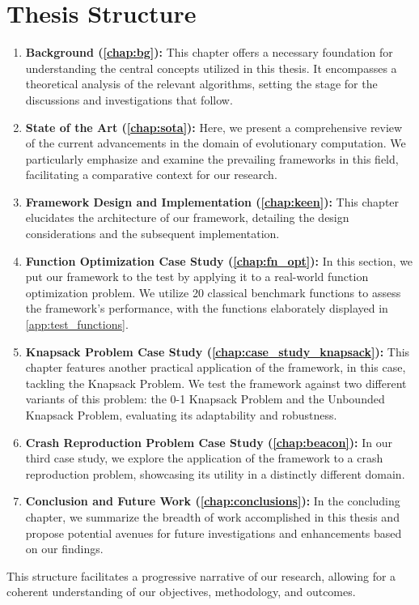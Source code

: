 \section{Thesis Structure}
\label{sec:structure}

  \begin{enumerate}
    \item \textbf{Background (\vref{chap:bg}):} This chapter offers a necessary 
      foundation for understanding the central concepts utilized in this thesis.
      It encompasses a theoretical analysis of the relevant algorithms, setting 
      the stage for the discussions and investigations that follow.
    \item \textbf{State of the Art (\vref{chap:sota}):} Here, we present a 
      comprehensive review of the current advancements in the domain of 
      evolutionary computation.
      We particularly emphasize and examine the prevailing frameworks in this 
      field, facilitating a comparative context for our research.
    \item \textbf{Framework Design and Implementation (\vref{chap:keen}):} This 
      chapter elucidates the architecture of our framework, detailing the
      design considerations and the subsequent implementation.
    \item \textbf{Function Optimization Case Study (\vref{chap:fn_opt}):} In 
      this section, we put our framework to the test by applying it to a 
      real-world function optimization problem.
      We utilize 20 classical benchmark functions to assess the framework's 
      performance, with the functions elaborately displayed in 
      \vref{app:test_functions}.
    \item \textbf{Knapsack Problem Case Study 
      (\vref{chap:case_study_knapsack}):} This chapter features another 
      practical application of the framework, in this case, tackling the 
      Knapsack Problem.
      We test the framework against two different variants of this problem: the 
      0-1 Knapsack Problem and the Unbounded Knapsack Problem, evaluating its 
      adaptability and robustness.
    \item \textbf{Crash Reproduction Problem Case Study (\vref{chap:beacon}):} 
      In our third case study, we explore the application of the framework to a 
      crash reproduction problem, showcasing its utility in a distinctly 
      different domain.
    \item \textbf{Conclusion and Future Work (\vref{chap:conclusions}):} In the 
      concluding chapter, we summarize the breadth of work accomplished in this 
      thesis and propose potential avenues for future investigations and 
      enhancements based on our findings.
  \end{enumerate}

  This structure facilitates a progressive narrative of our research, allowing 
  for a coherent understanding of our objectives, methodology, and outcomes.
